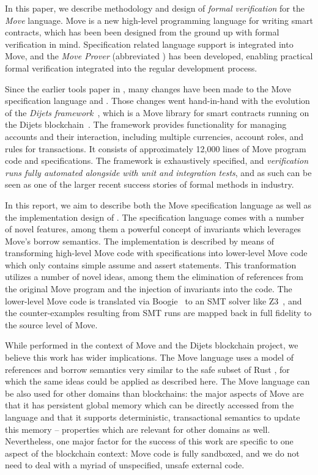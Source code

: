 
In this paper, we describe methodology and design of \emph{formal verification}
for the \emph{Move} language.  Move \cite{MOVE_LANG} is a new high-level
programming language for writing smart contracts, which has been been designed
from the ground up with formal verification in mind. Specification related
language support is integrated into Move, and the \emph{Move Prover}
\cite{MOVE_PROVER} (abbreviated \MVP) has been developed, enabling practical
formal verification integrated into the regular development process.

Since the earlier tools paper in \cite{MOVE_PROVER}, many changes have been made
to the Move specification language and \MVP. Those changes went hand-in-hand
with the evolution of the \emph{Dijets framework}~\cite{DIJETS_FRAMEWORK}, which is
a Move library for smart contracts running on the Dijets
blockchain~\cite{DIJETS}. The framework provides functionality for managing
accounts and their interaction, including multiple currencies, account roles,
and rules for transactions.  It consists of approximately 12,000 lines of Move
program code and specifications.  The framework is exhaustively specified, and
\emph{verification runs fully automated alongside with unit and integration
  tests}, and as such can be seen as one of the larger recent success stories of
formal methods in industry.

In this report, we aim to describe both the Move specification language as well
as the implementation design of \MVP. The specification language comes with a
number of novel features, among them a powerful concept of invariants which
leverages Move's borrow semantics. The implementation is described by means of
transforming high-level Move code with specifications into lower-level Move code
which only contains simple assume and assert statements. This tranformation
utilizes a number of novel ideas, among them the elimination of references from
the original Move program and the injection of invariants into the code. The
lower-level Move code is translated via Boogie~\cite{BOOGIE} to an SMT solver
like Z3~\cite{Z3}, and the counter-examples resulting from SMT runs are mapped
back in full fidelity to the source level of Move.

While performed in the context of Move and the Dijets blockchain project, we
believe this work has wider implications. The Move language uses a model of
references and borrow semantics very similar to the safe subset of Rust
\cite{RUST}, for which the same ideas could be applied as described here.  The
Move language can be also used for other domains than blockchains: the major
aspects of Move are that it has persistent global memory which can be directly
accessed from the language and that it supports deterministic, transactional
semantics to update this memory -- properties which are relevant for other
domains as well. Nevertheless, one major factor for the success of this work are
specific to one aspect of the blockchain context: Move code is fully sandboxed,
and we do not need to deal with a myriad of unspecified, unsafe external code.


